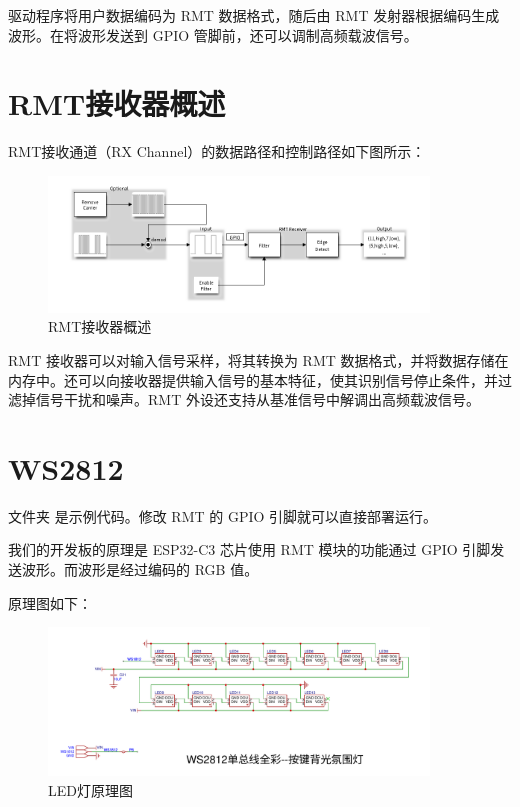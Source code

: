 \documentclass[lang=cn,newtx,10pt,scheme=chinese]{elegantbook}
\begin{document}
驱动程序将用户数据编码为 RMT 数据格式，随后由 RMT 发射器根据编码生成波形。在将波形发送到 GPIO 管脚前，还可以调制高频载波信号。

\section{RMT接收器概述}

RMT接收通道（RX Channel）的数据路径和控制路径如下图所示：

\begin{figure}[!htb]
\centering
\includegraphics[width=0.9\textwidth]{RMT-3.png}
\caption{RMT接收器概述}
\end{figure}

RMT 接收器可以对输入信号采样，将其转换为 RMT 数据格式，并将数据存储在内存中。还可以向接收器提供输入信号的基本特征，使其识别信号停止条件，并过滤掉信号干扰和噪声。RMT 外设还支持从基准信号中解调出高频载波信号。



\section{WS2812}

文件夹  是示例代码。修改 RMT 的 GPIO 引脚就可以直接部署运行。

我们的开发板的原理是 ESP32-C3 芯片使用 RMT 模块的功能通过 GPIO 引脚发送波形。而波形是经过编码的 RGB 值。

原理图如下：

\begin{figure}[!htb]
\centering
\includegraphics[width=0.9\textwidth]{ws2812.png}
\caption{LED灯原理图}
\end{figure}
\end{document}
